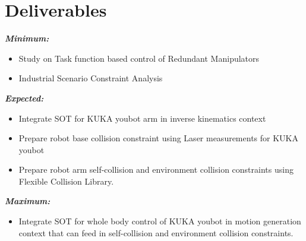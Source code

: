 
\section{Deliverables}
\textit{\textbf{Minimum:}}
\begin{itemize}
\item Study on Task function based control of Redundant Manipulators
\item Industrial Scenario Constraint Analysis
\end{itemize}
\textit{\textbf{Expected:}}
\begin{itemize}
\item Integrate SOT for KUKA youbot arm in inverse kinematics context
\item Prepare robot base collision constraint using Laser measurements for KUKA youbot 
\item Prepare robot arm self-collision and environment collision constraints using Flexible Collision Library.
\end{itemize}       
\textit{\textbf{Maximum:}}
\begin{itemize}
\item Integrate SOT for whole body control of KUKA youbot in motion generation context that can feed in self-collision and environment
collision constraints.
\end{itemize}
